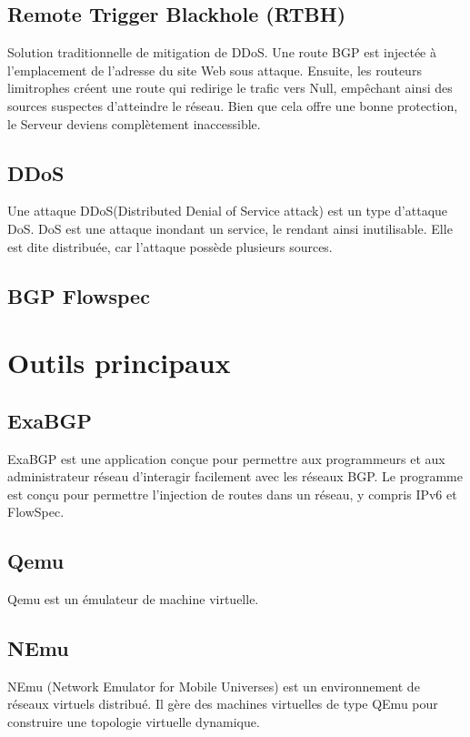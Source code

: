 \subsection{Remote Trigger Blackhole (RTBH)}
Solution traditionnelle de mitigation de DDoS. 
Une route BGP est injectée à l'emplacement de l’adresse du site Web sous attaque. Ensuite, les routeurs limitrophes créent une route qui redirige le trafic vers Null, empêchant ainsi des sources suspectes d'atteindre le réseau. Bien que cela offre une bonne protection, le Serveur deviens complètement inaccessible.

\subsection{DDoS}
Une attaque DDoS(Distributed Denial of Service attack) est un type d'attaque DoS. DoS est une attaque inondant un service, le rendant ainsi inutilisable. Elle est dite distribuée, car l'attaque possède plusieurs sources.






\subsection{BGP Flowspec}




\section{Outils principaux}

\subsection{ExaBGP}
ExaBGP est une application conçue pour permettre aux programmeurs et aux administrateur réseau d’interagir facilement avec les réseaux BGP. Le programme est conçu pour permettre l’injection de routes dans un réseau, y compris IPv6 et FlowSpec.
\cite{Man10}



\subsection{Qemu}

Qemu est un émulateur de machine virtuelle.

\subsection{NEmu}
NEmu (Network Emulator for Mobile Universes) est un environnement de réseaux virtuels distribué. Il gère des machines virtuelles de type QEmu pour construire une topologie virtuelle dynamique.


